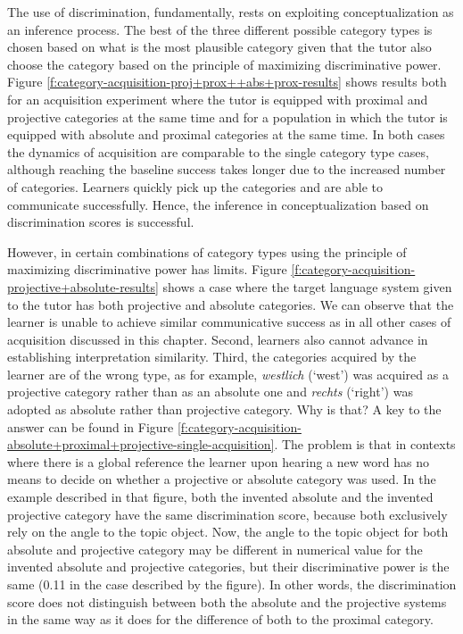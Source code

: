 The use of discrimination, fundamentally, rests on exploiting 
conceptualization as an inference process. The best of the three
different possible category types is chosen based on what is the most 
plausible category given that the tutor also choose the category based on 
the principle of maximizing discriminative power.
Figure \ref{f:category-acquisition-proj+prox++abs+prox-results} 
shows results both for an
acquisition experiment where the tutor is equipped with proximal 
and projective categories at the same time and
for a population in which the tutor is equipped with
absolute and proximal categories at the same time. 
In both cases the dynamics of acquisition are comparable 
to the single category type cases, although reaching the baseline 
success takes longer due to the increased number of categories.
Learners quickly pick up the categories and are able to communicate 
successfully. Hence, the inference in conceptualization based on discrimination
scores is successful.

However, in certain combinations of category types using the 
principle of maximizing discriminative power has limits. 
Figure \ref{f:category-acquisition-projective+absolute-results} shows 
a case where the target language system
given to the tutor has both projective and absolute categories. We can observe
that the learner is unable to achieve similar communicative success as in all
other cases of acquisition discussed in this chapter. Second, learners also 
cannot advance in establishing interpretation similarity. Third, the categories
acquired by the learner are of the wrong type, as for example, \textit{westlich} (`west')
was acquired as a projective category rather than as an absolute one and \textit{rechts} (`right')
was adopted as absolute rather than projective category. Why is that?
A key to the answer can be found in Figure 
\ref{f:category-acquisition-absolute+proximal+projective-single-acquisition}. 
The problem is that in contexts where there is a global reference the learner
upon hearing a new word has no means to decide on whether a projective or 
absolute category was used. In the example described in that figure, both the invented 
absolute and the invented projective category have the same discrimination score, 
because both exclusively rely on the angle to the topic object. Now, the angle to the
topic object for both absolute and projective category may be different in numerical 
value for the invented absolute and projective categories, but their discriminative power 
is the same (0.11 in the case described by the figure). 
In other words, the discrimination score does not distinguish between both
the absolute and the projective systems in the same way as it does for the difference
of both to the proximal category. 

